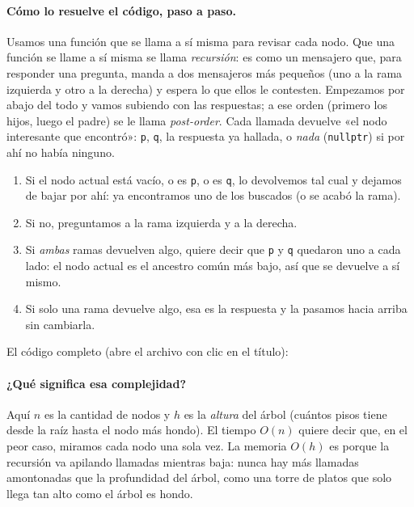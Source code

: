 \paragraph{Cómo lo resuelve el código, paso a paso.} Usamos una función que se
llama a sí misma para revisar cada nodo. Que una función se llame a sí misma se
llama \emph{recursión}: es como un mensajero que, para responder una pregunta,
manda a dos mensajeros más pequeños (uno a la rama izquierda y otro a la derecha)
y espera lo que ellos le contesten. Empezamos por abajo del todo y vamos subiendo
con las respuestas; a ese orden (primero los hijos, luego el padre) se le llama
\emph{post-order}. Cada llamada devuelve «el nodo interesante que encontró»:
\texttt{p}, \texttt{q}, la respuesta ya hallada, o \emph{nada}
(\texttt{nullptr}) si por ahí no había ninguno.
\begin{enumerate}
  \item Si el nodo actual está vacío, o es \texttt{p}, o es \texttt{q}, lo
        devolvemos tal cual y dejamos de bajar por ahí: ya encontramos uno de
        los buscados (o se acabó la rama).
  \item Si no, preguntamos a la rama izquierda y a la derecha.
  \item Si \emph{ambas} ramas devuelven algo, quiere decir que \texttt{p} y
        \texttt{q} quedaron uno a cada lado: el nodo actual es el ancestro común
        más bajo, así que se devuelve a sí mismo.
  \item Si solo una rama devuelve algo, esa es la respuesta y la pasamos hacia
        arriba sin cambiarla.
\end{enumerate}
El código completo (abre el archivo con clic en el título):




\paragraph{¿Qué significa esa complejidad?} Aquí $n$ es la cantidad de nodos y
$h$ es la \emph{altura} del árbol (cuántos pisos tiene desde la raíz hasta el
nodo más hondo). El tiempo $O(n)$ quiere decir que, en el peor caso, miramos
cada nodo una sola vez. La memoria $O(h)$ es porque la recursión va apilando
llamadas mientras baja: nunca hay más llamadas amontonadas que la profundidad
del árbol, como una torre de platos que solo llega tan alto como el árbol es
hondo.

